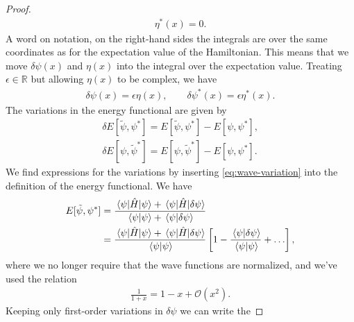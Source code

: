 \begin{proof}
\begin{gather}
{                }
                \eta^{*}(x)
                = 0.
            \end{gather}
            A word on notation, on the right-hand sides the integrals are over
            the same coordinates as for the expectation value of the
            Hamiltonian.
            This means that we move $\delta\psi(x)$ and $\eta(x)$ into the
            integral over the expectation value.
            Treating $\epsilon \in \mathbb{R}$ but allowing $\eta(x)$ to be
            complex, we have
            \begin{gather}
                \delta\psi(x) = \epsilon\eta(x),
                \qquad
                \delta\psi^{*}(x) = \epsilon\eta^{*}(x).
            \end{gather}
            The variations in the energy functional are given by
            \begin{gather}
                \delta E[\tilde{\psi}, \psi^{*}]
                = E[\tilde{\psi}, \psi^{*}]
                - E[\psi, \psi^{*}], \\
                \delta E[\psi, \tilde{\psi}^{*}]
                = E[\psi, \tilde{\psi}^{*}]
                - E[\psi, \psi^{*}].
            \end{gather}
            We find expressions for the variations by inserting
            \autoref{eq:wave-variation} into the definition of the energy
            functional.
            We have
            \begin{align}
                E[\tilde{\psi}, \psi^{*}]
                &= \frac{
                    \mel*{\psi}{\hamil}{\psi}
                    + \mel*{\psi}{\hamil}{\delta\psi}
                }{
                    \braket*{\psi}
                    + \braket*{\psi}{\delta\psi}
                }
                \\
                &= \frac{
                    \mel*{\psi}{\hamil}{\psi}
                    + \mel*{\psi}{\hamil}{\delta\psi}
                }{
                    \braket*{\psi}
                }\brak{
                    1 - \frac{\braket*{\psi}{\delta\psi}}{\braket*{\psi}}
                    + \dots
                },
            \end{align}
            where we no longer require that the wave functions are normalized,
            and we've used the relation
            \begin{align}
                \frac{1}{1 + x} = 1 - x + \mathcal{O}(x^2).
            \end{align}
            Keeping only first-order variations in $\delta\psi$ we can write the

\end{proof}
